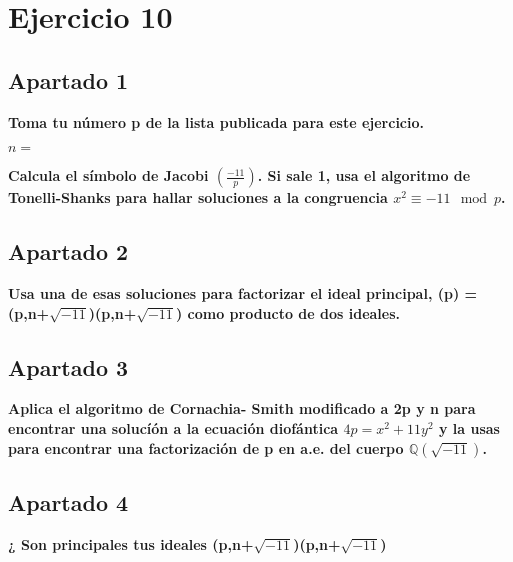 \documentclass[a4paper]{article}
\title {\fbox{\Huge{\textbf{Ejercicio 10}}}}
\author {\fbox{Ana Buendía Ruiz-Azuaga}}
\begin{document}
\maketitle


\section{Ejercicio 10}

\subsection{Apartado 1}

\textbf{Toma tu número p de la lista publicada para este ejercicio.}

$n = $

\textbf{Calcula el símbolo de Jacobi $\left( \frac{-11}{p} \right)$. Si sale 1, usa el algoritmo de Tonelli-Shanks para hallar soluciones a la congruencia $x^2 \equiv -11 \mod p$.}

\subsection{Apartado 2}
\textbf{Usa una de esas soluciones para factorizar el ideal principal, (p) =(p,n+$\sqrt{-11}$)(p,n+$\sqrt{-11}$) como producto de dos ideales.}



\subsection{Apartado 3}
\textbf{Aplica el algoritmo de Cornachia- Smith modificado a 2p y n para encontrar una solucíón a la ecuación diofántica $4p =x^2 + 11y^2$ y la usas para encontrar una factorización de p en a.e. del cuerpo $\mathbb{Q}(\sqrt{-11})$.}



\subsection{Apartado 4}
\textbf{¿ Son principales tus ideales (p,n+$\sqrt{-11}$)(p,n+$\sqrt{-11}$)}
\end{document}
